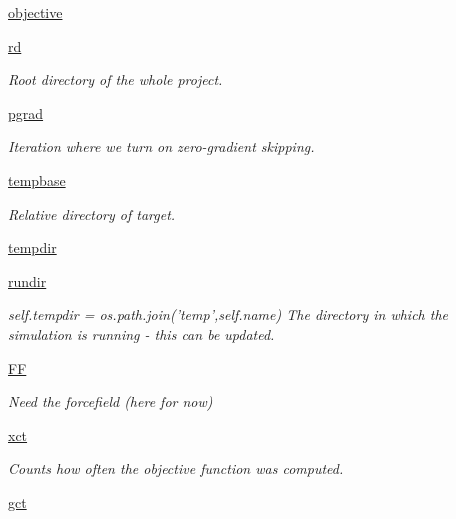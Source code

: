 \begin{DoxyCompactItemize}
\item 
\hyperlink{classforcebalance_1_1moments_1_1Moments_aa90c357e8ee9f18bb9db99688bbeb227}{objective}
\item 
\hyperlink{classforcebalance_1_1target_1_1Target_a4edb69fbde792e9f2f27e54b7c978c8e}{rd}
\begin{DoxyCompactList}\small\item\em Root directory of the whole project. \end{DoxyCompactList}\item 
\hyperlink{classforcebalance_1_1target_1_1Target_a684235b4332b608c4e2da22982c2fdfa}{pgrad}
\begin{DoxyCompactList}\small\item\em Iteration where we turn on zero-\/gradient skipping. \end{DoxyCompactList}\item 
\hyperlink{classforcebalance_1_1target_1_1Target_ae5b544d3e11365865813ef3d626ef81d}{tempbase}
\begin{DoxyCompactList}\small\item\em Relative directory of target. \end{DoxyCompactList}\item 
\hyperlink{classforcebalance_1_1target_1_1Target_aa1f01b5b78db253b5b66384ed11ed193}{tempdir}
\item 
\hyperlink{classforcebalance_1_1target_1_1Target_a6872de5b2d4273b82336ea5b0da29c9e}{rundir}
\begin{DoxyCompactList}\small\item\em self.\-tempdir = os.\-path.\-join('temp',self.\-name) The directory in which the simulation is running -\/ this can be updated. \end{DoxyCompactList}\item 
\hyperlink{classforcebalance_1_1target_1_1Target_a38a37919783141ea37fdcf8b00ce0aaf}{F\-F}
\begin{DoxyCompactList}\small\item\em Need the forcefield (here for now) \end{DoxyCompactList}\item 
\hyperlink{classforcebalance_1_1target_1_1Target_aad2e385cfbf7b4a68f1c2cb41133fe82}{xct}
\begin{DoxyCompactList}\small\item\em Counts how often the objective function was computed. \end{DoxyCompactList}\item 
\hyperlink{classforcebalance_1_1target_1_1Target_aa625ac88c6744eb14ef281d9496d0dbb}{gct}

\end{DoxyCompactItemize}
